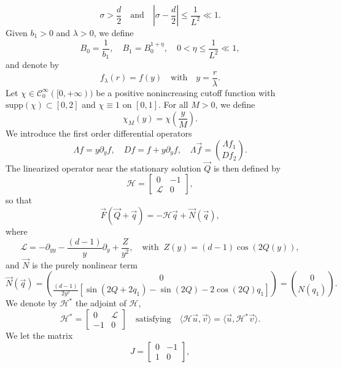 \documentclass[11pt]{aims}
\theoremstyle{definition}
\numberwithin{equation}{section}
\begin{document}
\begin{equation}\label{def:sigma}
\sigma > \frac{d}{2} \quad \text{and}\quad \left|\sigma - \frac{d}{2} \right| \leq \frac{1}{L^2} \ll 1.
\end{equation}
Given $b_1 > 0$ and $\lambda > 0$, we define 
\begin{equation}\label{def:B0B1}
B_0 = \frac{1}{ b_1}, \quad B_1 = B_0^{1 + \eta}, \quad 0 < \eta \leq \frac{1}{L^2} \ll 1,
\end{equation}
and denote by
$$f_\lambda(r) = f(y) \quad \text{with} \quad y = \frac{r}{\lambda}.$$
Let $\chi \in {\mathcal{C}}_0^\infty([0, +\infty))$ be a positive nonincreasing cutoff function with $\text{supp}(\chi) \subset [0,2]$ and $\chi \equiv 1$ on $[0,1]$. For all $M > 0$, we define
\begin{equation}\label{def:chiM}
\chi_M(y) = \chi\left(\frac y M\right).
\end{equation}
We introduce the first order differential operators 
$$\Lambda f = y\partial_y f, \quad Df = f + y{\partial_y} f, \quad \Lambda \vec f = \binom{\Lambda f_1}{Df_2}.$$
The linearized operator near the stationary solution $\vec Q$ is then defined by 
\begin{equation}\label{def:Hop}
{\mathscr{H}} = \begin{bmatrix}
0&-1\\{\mathscr{L}} & 0
\end{bmatrix},
\end{equation}
so that 
$$\vec F(\vec Q + \vec q) = - {\mathscr{H}} \vec q + \vec N(\vec q),$$
where 
\begin{equation}\label{def:Lc}
{\mathscr{L}}  = -\partial_{yy} - \frac{(d-1)}{y}\partial_y  + \frac{Z}{y^2}, \quad \text{with}\;\; Z(y)= (d-1)\cos(2Q(y)),
\end{equation}
and $\vec N$ is the purely nonlinear term
\begin{equation}\label{def:Nvec}
\vec{N}(\vec q)= \binom{0}{\frac{(d-1)}{2y^2}\left[\sin(2Q + 2 q_1) - \sin(2Q) - 2\cos(2Q)q_1\right]} = \binom{0}{N(q_1)}.
\end{equation}
We denote by ${\mathscr{H}}^*$ the adjoint of ${\mathscr{H}}$, 
$${\mathscr{H}}^* = \begin{bmatrix}
 0 & {\mathscr{L}} \\ -1 & 0
\end{bmatrix} \quad \text{satisfying} \quad \big \langle {\mathscr{H}} \vec u, \vec v \big \rangle = \big \langle \vec u, {\mathscr{H}}^* \vec v \big \rangle.$$
We let the matrix 
\begin{equation}
J = \begin{bmatrix}
0 & -1 \\ 1 &0
\end{bmatrix}, 
\end{equation}
\end{document}
